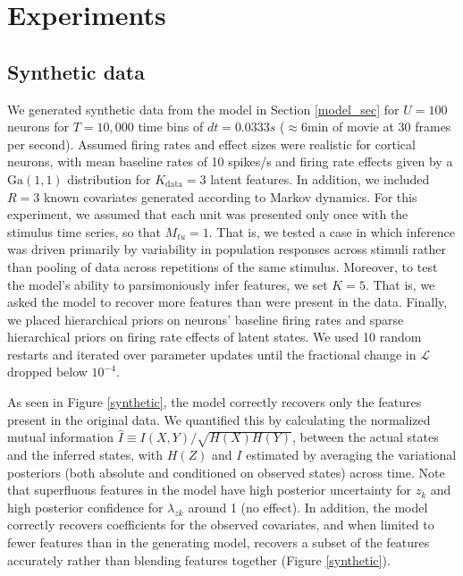 \documentclass[10pt,letterpaper]{article}
\begin{document}
\section*{Experiments}
\subsection*{Synthetic data}
We generated synthetic data from the model in Section \ref{model_sec} for $U=100$ neurons for $T=10,000$ time bins of $dt=0.0333s$ ($\approx 6$min of movie at 30 frames per second). Assumed firing rates and effect sizes were realistic for cortical neurons, with mean baseline rates of 10 spikes/s and firing rate effects given by a $\text{Ga}(1, 1)$ distribution for $K_{\text{data}}=3$ latent features. In addition, we included $R=3$ known covariates generated according to Markov dynamics. For this experiment, we assumed that each unit was presented only once with the stimulus time series, so that $M_{tu} = 1$. That is, we tested a case in which inference was driven primarily by variability in population responses across stimuli rather than pooling of data across repetitions of the same stimulus. Moreover, to test the model's ability to parsimoniously infer features, we set $K=5$. That is, we asked the model to recover more features than were present in the data. Finally, we placed hierarchical priors on neurons' baseline firing rates and sparse hierarchical priors on firing rate effects of latent states. We used 10 random restarts and iterated over parameter updates until the fractional change in $\mathcal{L}$ dropped below $10^{-4}$.

As seen in Figure \ref{synthetic}, the model correctly recovers only the features present in the original data. We quantified this by calculating the normalized mutual information $\hat{I}\equiv I(X, Y)/\sqrt{H(X)H(Y)}$, between the actual states and the inferred states, with $H(Z)$ and $I$ estimated by averaging the variational posteriors (both absolute and conditioned on observed states) across time. Note that superfluous features in the model have high posterior uncertainty for $z_k$ and high posterior confidence for $\lambda_{zk}$ around 1 (no effect). In addition, the model correctly recovers coefficients for the observed covariates, and when limited to fewer features than in the generating model, recovers a subset of the features accurately rather than blending features together (Figure \ref{synthetic}).
\end{document}
